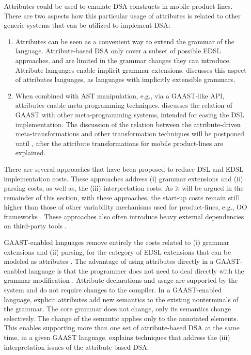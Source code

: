 Attributes could be used to emulate DSA constructs in mobile product-lines. There are two aspects how this particular usage of attributes is related to other generic systems that can be utilized to implement DSA:
\begin{enumerate}[1.]
\item Attributes can be seen as a convenient way to extend the grammar of the language. Attribute-based DSA only cover a subset of possible EDSL approaches, and are limited in the grammar changes they can introduce. Attribute languages enable implicit grammar extensions.  discusses this aspect of attributes languages, as languages with implicitly extensible grammars. 
\item When combined with AST manipulation, e.g., via a GAAST-like API, attributes enable meta-programming techniques.  discusses the relation of GAAST with other meta-programming systems, intended for easing the DSL implementation. The discussion of the relation between the attribute-driven meta-transformations and other transformation techniques will be postponed until , after the attribute transformations for mobile product-lines are explained.
\end{enumerate}

There are several approaches \cite{deursenetal.00,kamin.98,cardelli94extensible,batory98jts,stratego.01,hudak98modular,java.jse,java.epp,java.maya,java.openJava} that have been proposed to reduce DSL and EDSL implementation costs. These approaches address (i) grammar extensions and (ii) parsing costs, as well as, the (iii) interpretation costs. As it will be argued in the remainder of this section, with these approaches, the start-up costs remain still higher than those of other variability mechanisms used for product-lines, e.g., OO frameworks . These approaches also often introduce heavy external dependencies on third-party tools .

GAAST-enabled languages remove entirely the costs related to (i) grammar extensions and (ii) parsing, for the category of EDSL extensions that can be modeled as attributes . The advantage of using attributes directly in a GAAST-enabled language is that the programmer does not need to deal directly with the grammar modification \cite{Taha.1997}. Attribute declarations and usage are supported by the system and do not require changes to the compiler. In a GAAST-enabled language, explicit attributes \cite{java.explicit.programming,hedin.97} add new semantics to the existing nonterminals of the grammar. The core grammar does not change, only its semantics change selectively. The change of the semantic applies only to the annotated elements. This enables supporting more than one set of attribute-based DSA at the same time, in a given GAAST language.  explains techniques that address the (iii) interpretation issues of the attribute-based DSA.

